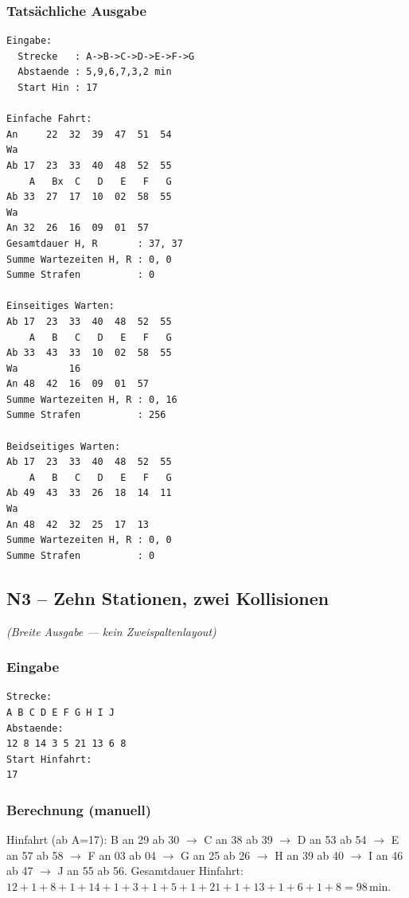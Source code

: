 \documentclass[12pt,a4paper]{article}
\begin{document}
\hfill
\begin{minipage}[t]{0.48\textwidth}
\scriptsize
\subsubsection*{Tatsächliche Ausgabe}
\begin{lstlisting}
Eingabe:
  Strecke   : A->B->C->D->E->F->G
  Abstaende : 5,9,6,7,3,2 min
  Start Hin : 17

Einfache Fahrt:
An     22  32  39  47  51  54
Wa
Ab 17  23  33  40  48  52  55
    A   Bx  C   D   E   F   G
Ab 33  27  17  10  02  58  55
Wa
An 32  26  16  09  01  57
Gesamtdauer H, R       : 37, 37
Summe Wartezeiten H, R : 0, 0
Summe Strafen          : 0

Einseitiges Warten:
Ab 17  23  33  40  48  52  55
    A   B   C   D   E   F   G
Ab 33  43  33  10  02  58  55
Wa         16
An 48  42  16  09  01  57
Summe Wartezeiten H, R : 0, 16
Summe Strafen          : 256

Beidseitiges Warten:
Ab 17  23  33  40  48  52  55
    A   B   C   D   E   F   G
Ab 49  43  33  26  18  14  11
Wa
An 48  42  32  25  17  13
Summe Wartezeiten H, R : 0, 0
Summe Strafen          : 0
\end{lstlisting}
\end{minipage}

\subsection{N3 – Zehn Stationen, zwei Kollisionen}
\label{test:n3}
\textit{(Breite Ausgabe — kein Zweispaltenlayout)}

\subsubsection*{Eingabe}
\begin{lstlisting}
Strecke:
A B C D E F G H I J
Abstaende:
12 8 14 3 5 21 13 6 8
Start Hinfahrt:
17
\end{lstlisting}

\subsubsection*{Berechnung (manuell)}
Hinfahrt (ab A=17): B an 29 ab 30 $\to$ C an 38 ab 39 $\to$ D an 53 ab 54 $\to$ E an 57 ab 58 $\to$ F an 03 ab 04 $\to$ G an 25 ab 26 $\to$ H an 39 ab 40 $\to$ I an 46 ab 47 $\to$ J an 55 ab 56.
Gesamtdauer Hinfahrt: $12+1+8+1+14+1+3+1+5+1+21+1+13+1+6+1+8 = 98$\,min.
\end{document}
